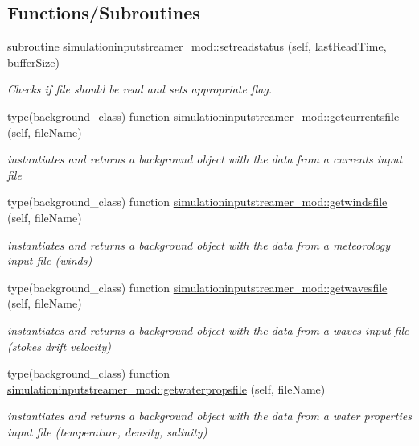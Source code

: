 \subsection*{Functions/\+Subroutines}
\begin{DoxyCompactItemize}
\item 
subroutine \mbox{\hyperlink{namespacesimulationinputstreamer__mod_a9ebef1f85eeb213cf69ea18ca012e047}{simulationinputstreamer\+\_\+mod\+::setreadstatus}} (self, last\+Read\+Time, buffer\+Size)
\begin{DoxyCompactList}\small\item\em Checks if file should be read and sets appropriate flag. \end{DoxyCompactList}\item 
type(background\+\_\+class) function \mbox{\hyperlink{namespacesimulationinputstreamer__mod_af1f989baa363031aac274694aeacfad5}{simulationinputstreamer\+\_\+mod\+::getcurrentsfile}} (self, file\+Name)
\begin{DoxyCompactList}\small\item\em instantiates and returns a background object with the data from a currents input file \end{DoxyCompactList}\item 
type(background\+\_\+class) function \mbox{\hyperlink{namespacesimulationinputstreamer__mod_ac69aeed5ee36930444f6e5389071994e}{simulationinputstreamer\+\_\+mod\+::getwindsfile}} (self, file\+Name)
\begin{DoxyCompactList}\small\item\em instantiates and returns a background object with the data from a meteorology input file (winds) \end{DoxyCompactList}\item 
type(background\+\_\+class) function \mbox{\hyperlink{namespacesimulationinputstreamer__mod_a28ca430c32786d6df906f295bedf54df}{simulationinputstreamer\+\_\+mod\+::getwavesfile}} (self, file\+Name)
\begin{DoxyCompactList}\small\item\em instantiates and returns a background object with the data from a waves input file (stokes drift velocity) \end{DoxyCompactList}\item 
type(background\+\_\+class) function \mbox{\hyperlink{namespacesimulationinputstreamer__mod_a7e82619f63c76454a4ea97e3a0b4bc48}{simulationinputstreamer\+\_\+mod\+::getwaterpropsfile}} (self, file\+Name)
\begin{DoxyCompactList}\small\item\em instantiates and returns a background object with the data from a water properties input file (temperature, density, salinity) \end{DoxyCompactList}\item 

\end{DoxyCompactItemize}
